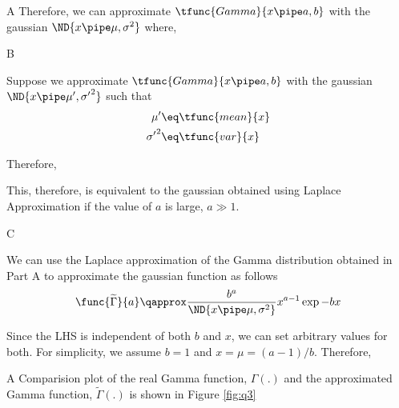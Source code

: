 \documentclass{article}
\begin{document}
\begin{question}
\begin{qpart}{A}
		Therefore, we can approximate $\tfunc{Gamma}{x \pipe a, b}$ with the gaussian $\ND{x \pipe \mu, \sigma^2}$ where,

	\end{qpart}

	\begin{qpart}{B}

		Suppose we approximate $\tfunc{Gamma}{x \pipe a, b}$ with the gaussian $\ND{x \pipe \mu', {\sigma'}^2}$ such that
		\begin{align*}
			\mu'		&\eq	\tfunc{mean}{x} \\
			{\sigma'}^2	&\eq	\tfunc{var}{x}
		\end{align*}

		Therefore,

		This, therefore, is equivalent to the gaussian obtained using Laplace Approximation if the value of $a$ is large, \ie $a \gg 1$.

	\end{qpart}

	\begin{qpart}{C}

		We can use the Laplace approximation of the Gamma distribution obtained in Part A to approximate the gaussian function as follows
		\begin{align*}
			\func{\widetilde{\Gamma}}{a}	\qapprox	\frac{b^a}{\ND{x \pipe \mu, \sigma^2}} x^{a - 1} \exp{-bx}
		\end{align*}

		Since the LHS is independent of both $b$ and $x$, we can set arbitrary values for both. For simplicity, we assume $b = 1$ and $x = \mu = (a - 1) / b$. Therefore,

		A Comparision plot of the real Gamma function, $\Gamma(.)$ and the approximated Gamma function, $\widetilde{\Gamma}(.)$ is shown in Figure \ref{fig:q3}


\end{qpart}
\end{question}
\end{document}
